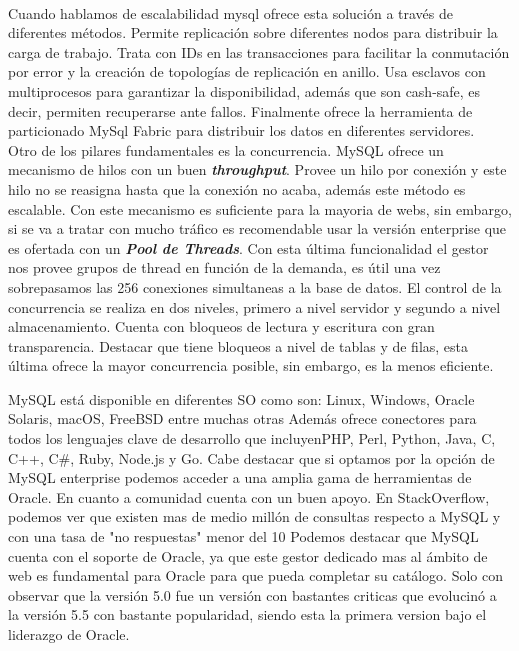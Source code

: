 \documentclass{article}
\begin{document}
\cite{10web}\\
Cuando hablamos de escalabilidad mysql ofrece esta solución a través de diferentes métodos. Permite replicación sobre diferentes nodos para distribuir la carga de trabajo. Trata con IDs en las transacciones para facilitar la conmutación por error y la creación de topologías de replicación en anillo. Usa esclavos con multiprocesos para garantizar la disponibilidad, además que son cash-safe, es decir, permiten recuperarse ante fallos. Finalmente ofrece la herramienta de particionado MySql Fabric para distribuir los datos en diferentes servidores.\\
Otro de los pilares fundamentales es la concurrencia. MySQL ofrece un mecanismo de hilos con un buen \textbf{\textit{throughput}}. Provee un hilo por conexión y este hilo no se reasigna hasta que la conexión no acaba, además este método es escalable. Con este mecanismo es suficiente para la mayoria de webs, sin embargo, si se va a tratar con mucho tráfico es recomendable usar la versión enterprise que es ofertada con un \textbf{\textit{Pool de Threads}}. Con esta última funcionalidad el gestor nos provee grupos de thread en función de la demanda, es útil una vez sobrepasamos las 256 conexiones simultaneas a la base de datos.
El control de la concurrencia se realiza en dos niveles, primero a nivel servidor y segundo a nivel almacenamiento. Cuenta con bloqueos de lectura y escritura con gran transparencia. Destacar que tiene bloqueos a nivel de tablas y de filas, esta última ofrece la mayor concurrencia posible, sin embargo, es la menos eficiente. 


MySQL está disponible en diferentes SO como son: Linux, Windows, Oracle Solaris,  macOS, FreeBSD entre muchas otras
Además ofrece conectores para todos los lenguajes clave de desarrollo que incluyenPHP, Perl, Python, Java, C, C++, C\#, Ruby, Node.js y Go. Cabe destacar que si optamos por la opción de MySQL enterprise podemos acceder a una amplia gama de herramientas de Oracle. 
En cuanto a comunidad cuenta con un buen apoyo. En StackOverflow, podemos ver que existen mas de medio millón de consultas respecto a MySQL y con una tasa de "no respuestas" menor del 10%
Podemos destacar que MySQL cuenta con el soporte de Oracle, ya que este gestor dedicado mas al ámbito de web es fundamental para Oracle para que pueda completar su catálogo. Solo con observar que la versión 5.0 fue un versión con bastantes criticas que evolucinó a la versión 5.5 con bastante popularidad, siendo esta la primera version bajo el liderazgo de Oracle.
\end{document}
